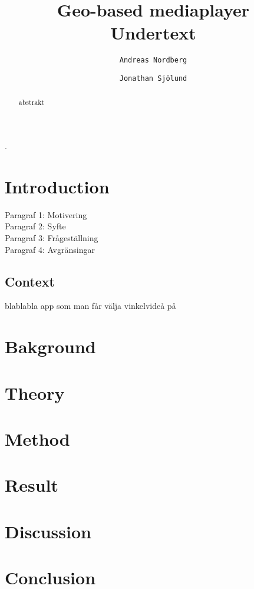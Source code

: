 \documentclass[9pt,a4paper]{acmproc}
\author{
	  \texttt{Andreas Nordberg}
  \and
  \texttt{Jonathan Sjölund}
}
\begin{document}

\title{%
	Geo-based mediaplayer \\
	\large Undertext}
\maketitle

\clearpage
.
\clearpage

\begin{abstract}

abstrakt
\end{abstract}

\clearpage

\section{Introduction} 
Paragraf 1: Motivering \\
Paragraf 2: Syfte \\
Paragraf 3: Frågeställning \\
Paragraf 4: Avgränsingar 

\subsection{Context}
blablabla app som man får välja vinkelvideå på

\section{Bakground}

\section{Theory}

\section{Method}

\section{Result}

\section{Discussion}

\section{Conclusion}
\end{document}
